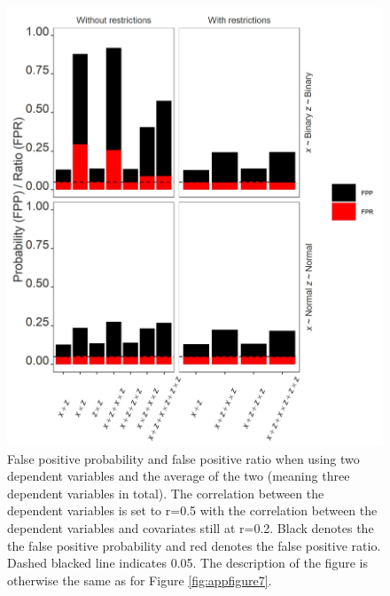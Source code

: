 \begin{figure}[hbt!]
\includegraphics{R/Analysis/Result/Figures/Figure3SIBon.jpeg}
\centering
\caption{False positive probability and false positive ratio when using two dependent variables and the average of the two (meaning three dependent variables in total). The correlation between the dependent variables is set to r=0.5 with the correlation between the dependent variables and covariates still at r=0.2. Black denotes the the false positive probability and red denotes the false positive ratio. Dashed blacked line indicates 0.05. The description of the figure is otherwise the same as for Figure \ref{fig:appfigure7}.}
\label{fig:appfigure9}
\end{figure}



